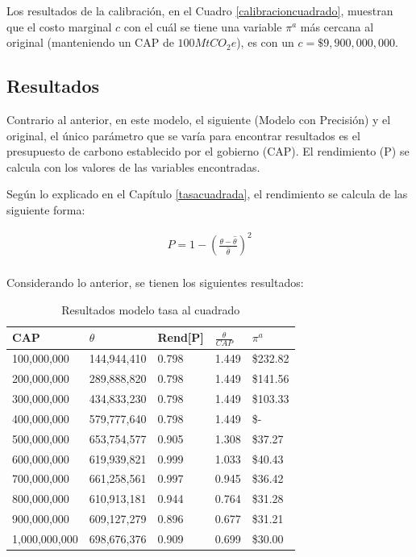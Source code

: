 Los resultados de la calibración, en el Cuadro \ref{calibracioncuadrado}, muestran que el costo marginal $c$ con el cuál se tiene una variable $\pi^a$ más cercana al original (manteniendo un CAP de $100MtCO_{2}e$), es con un $c=\$9,900,000,000$.

\subsection{Resultados}

Contrario al anterior, en este modelo, el siguiente (Modelo con Precisión) y el original, el único parámetro que se varía para encontrar resultados es el presupuesto de carbono establecido por el gobierno (CAP). El rendimiento (P) se calcula con los valores de las variables encontradas.
\vspace{2.5mm}

Según lo explicado en el Capítulo \ref{tasacuadrada}, el rendimiento se calcula de las siguiente forma: 
\vspace{2.5mm}

\begin{equation}
\begin{array}{rrclcl}
\displaystyle P = 1- (\frac{{\theta - \hat{\theta}}}{\hat{\theta}})^2 \\
\end{array}
\end{equation}

Considerando lo anterior, se tienen los siguientes resultados:

\begin{table}[H]
    \centering
    \begin{tabular}{|l|l|l|l|l|}
    \hline
        CAP & $\theta$ & Rend[P] & $\frac{\theta}{CAP}$  & $\pi^a$  \\ \hline
        100,000,000 & 144,944,410  & 0.798  & 1.449  &  \$232.82   \\ \hline
        200,000,000 & 289,888,820  & 0.798  & 1.449  &  \$141.56   \\ \hline
        300,000,000 & 434,833,230  & 0.798  & 1.449  &  \$103.33   \\ \hline
        400,000,000 & 579,777,640  & 0.798  & 1.449  &  \$-   \\ \hline
        500,000,000 & 653,754,577  & 0.905  & 1.308  &  \$37.27   \\ \hline
        600,000,000 & 619,939,821  & 0.999  & 1.033  &  \$40.43   \\ \hline
        700,000,000 & 661,258,561  & 0.997  & 0.945  &  \$36.42   \\ \hline
        800,000,000 & 610,913,181  & 0.944  & 0.764  &  \$31.28   \\ \hline
        900,000,000 & 609,127,279  & 0.896  & 0.677  &  \$31.21   \\ \hline
        1,000,000,000 & 698,676,376  & 0.909  & 0.699  &  \$30.00   \\ \hline
    \end{tabular}
    \caption{{\footnotesize Resultados modelo tasa al cuadrado}}
    \label{resultadostasacuadrada}
\end{table}

